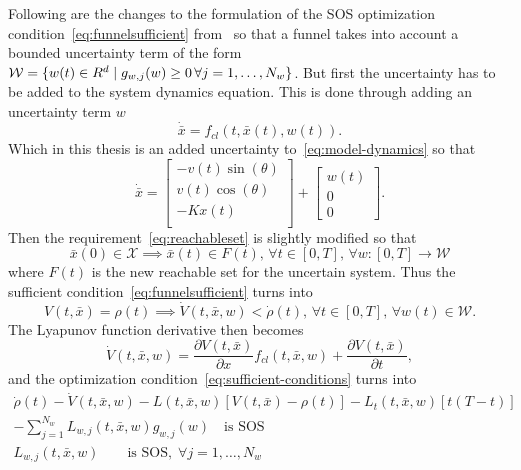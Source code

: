 Following are the changes to the formulation of the \ac{SOS} optimization
condition~\cref{eq:funnelsufficient} from~\cite{majumdarRobustOnlineMotion2013}
so that a funnel takes into account a bounded uncertainty term of the form
\(\mathcal{W} = \lbrace w(t) \in R^d \mid g_{w,j}(w) \geq 0\, \forall j =
  1,\ldots,N_w\rbrace\). But first the uncertainty has to be added to the system
dynamics equation. This is done through adding an uncertainty term \(w\)
\begin{equation}
  \dot{\bar{x}} = f_{cl}(t, \bar{x}(t), w(t)).
\end{equation}
Which in this thesis is an added uncertainty to~\cref{eq:model-dynamics} so that
\begin{equation}
  \dot{\bar{x}} = %
  \begin{bmatrix}
    -v(t)\sin(\theta) \\
    v(t)\cos(\theta) \\
    -Kx(t) \\
  \end{bmatrix}
  +
  \begin{bmatrix}
    w(t) \\
    0 \\
    0
  \end{bmatrix}.
\end{equation}
Then the requirement~\cref{eq:reachableset} is slightly modified so that
\begin{equation}
  \label{eq:uncertain-reachableset}
  \bar{x}(0) \in \mathcal{X} \implies \bar{x}(t) \in F(t),\, \forall t \in
  [0,T], \, \forall w \colon [0,T] \rightarrow \mathcal{W}
\end{equation} 
where \(F(t)\) is the new reachable set for the uncertain system. Thus the
sufficient condition~\cref{eq:funnelsufficient} turns into
\begin{equation}
  \label{eq:funneluncertain-sufficient}
  V(t,\bar{x}) = \rho(t) \implies \dot{V}(t,\bar{x},w) < \dot{\rho}(t), \, \forall t \in [0,T], \, \forall w(t) \in \mathcal{W}.
\end{equation}
The Lyapunov function derivative then becomes
\begin{equation}
  \dot{V}(t,\bar{x}, w) = \frac{\partial V(t,\bar{x})}{\partial x} f_{cl}(t,\bar{x},w) + \frac{\partial V(t,\bar{x})}{\partial t},
\end{equation}
and the optimization condition~\cref{eq:sufficient-conditions} turns into
\begin{align}
  \label{eq:optimizationconditionuncertain}
  \dot{\rho}(t) - \dot{V}(t,\bar{x},w) - L(t,\bar{x},w) \left[ V(t,\bar{x}) - \rho(t) \right] - L_{t}(t,\bar{x},w)\left[ t\left( T - t \right) \right]  & \nonumber \\
  - \sum_{j=1}^{N_{w}} L_{w,j}(t,\bar{x},w)g_{w,j}(w) \quad \text{is SOS} &  \\
  L_{w,j}(t,\bar{x},w) \qquad \text{is SOS}, \; \forall j = 1,\ldots,N_w \nonumber
\end{align}

